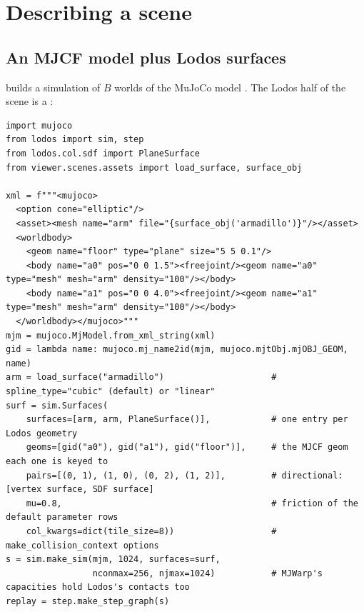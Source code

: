 \section{Describing a scene}\label{sec:scene}

\subsection{An MJCF model plus Lodos surfaces}\label{sec:surfaces}

 builds a simulation of $B$ worlds of the MuJoCo model . The Lodos half of the scene is a :

\begin{lstlisting}
import mujoco
from lodos import sim, step
from lodos.col.sdf import PlaneSurface
from viewer.scenes.assets import load_surface, surface_obj

xml = f"""<mujoco>
  <option cone="elliptic"/>
  <asset><mesh name="arm" file="{surface_obj('armadillo')}"/></asset>
  <worldbody>
    <geom name="floor" type="plane" size="5 5 0.1"/>
    <body name="a0" pos="0 0 1.5"><freejoint/><geom name="a0" type="mesh" mesh="arm" density="100"/></body>
    <body name="a1" pos="0 0 4.0"><freejoint/><geom name="a1" type="mesh" mesh="arm" density="100"/></body>
  </worldbody></mujoco>"""
mjm = mujoco.MjModel.from_xml_string(xml)
gid = lambda name: mujoco.mj_name2id(mjm, mujoco.mjtObj.mjOBJ_GEOM, name)
arm = load_surface("armadillo")                     # spline_type="cubic" (default) or "linear"
surf = sim.Surfaces(
    surfaces=[arm, arm, PlaneSurface()],            # one entry per Lodos geometry
    geoms=[gid("a0"), gid("a1"), gid("floor")],     # the MJCF geom each one is keyed to
    pairs=[(0, 1), (1, 0), (0, 2), (1, 2)],         # directional: [vertex surface, SDF surface]
    mu=0.8,                                         # friction of the default parameter rows
    col_kwargs=dict(tile_size=8))                   # make_collision_context options
s = sim.make_sim(mjm, 1024, surfaces=surf,
                 nconmax=256, njmax=1024)           # MJWarp's capacities hold Lodos's contacts too
replay = step.make_step_graph(s)
\end{lstlisting}

